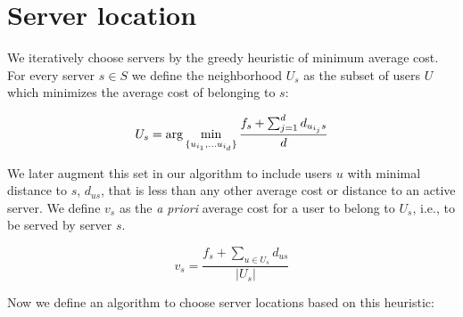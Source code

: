\documentclass[12pt]{article}
\def\argmin{{\rm arg} \mathop{\rm {min}}}
\begin{document}
\section{Server location}

We iteratively choose servers by the greedy heuristic of minimum average
cost. For every server $s \in S$ we define the neighborhood $U_s$ as
the subset of users $U$ which minimizes the average cost of belonging to $s$:

\begin{displaymath}
U_s = \argmin_{\{u_{i_1}, \ldots u_{i_d}\}} \frac{f_s + \sum_{j=1}^d d_{u_{i_j}s}}{d}
\end{displaymath}

We later augment this set in our algorithm to include users $u$ with minimal
distance to $s$, $d_{us}$, that is less than any other average cost or
distance to an active server.
We define $v_s$ as the \textit{a priori}
average cost for a user to belong to $U_s$, i.e., to be
served by server $s$.

\begin{displaymath}
v_s = \frac{f_s + \sum_{u \in U_s} d_{us}}{|U_s|}
\end{displaymath}

Now we define an algorithm to choose server locations based on this heuristic:
\end{document}
